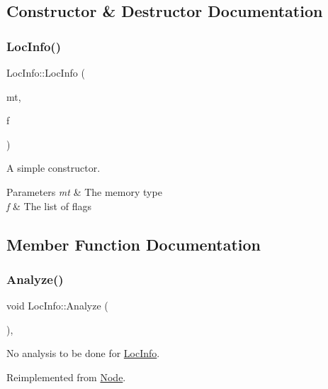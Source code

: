\subsection{Constructor \& Destructor Documentation}
\mbox{\label{class_loc_info_a871ae68c7b70efe62dc2baaa0f588b0a}} 
\subsubsection{\texorpdfstring{Loc\+Info()}{LocInfo()}}
{\footnotesize\ttfamily Loc\+Info\+::\+Loc\+Info (\begin{DoxyParamCaption}\item[{\hyperlink{class_mem_type}{Mem\+Type} $\ast$}]{mt,  }\item[{\hyperlink{class_list}{List}$<$ \hyperlink{class_flag}{Flag} $\ast$$>$ $\ast$}]{f }\end{DoxyParamCaption})}

A simple constructor. 
\begin{DoxyParams}{Parameters}
{\em mt} & The memory type \\
\hline
{\em f} & The list of flags \\
\hline
\end{DoxyParams}


\subsection{Member Function Documentation}
\mbox{\label{class_loc_info_a129d70c92d57a7ab130b699ee8052ef4}} 
\subsubsection{\texorpdfstring{Analyze()}{Analyze()}}
{\footnotesize\ttfamily void Loc\+Info\+::\+Analyze (\begin{DoxyParamCaption}{ }\end{DoxyParamCaption})\hspace{0.3cm}{\ttfamily [inline]}, {\ttfamily [virtual]}}

No analysis to be done for \hyperlink{class_loc_info}{Loc\+Info}. 

Reimplemented from \hyperlink{class_node_a5f88d55c6f253a29def7ccc443d83d47}{Node}.

